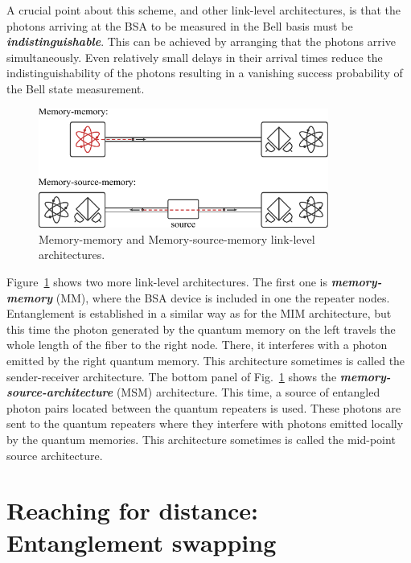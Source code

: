 A crucial point about this scheme, and other link-level architectures, is that the photons arriving at the BSA to be measured in the Bell basis must be \textit{\textbf{indistinguishable}}.
This can be achieved by arranging that the photons arrive simultaneously. 
Even relatively small delays in their arrival times reduce the indistinguishability of the photons resulting in a vanishing success probability of the Bell state measurement.

\begin{figure}[t]
    \centering
    \includegraphics[width=0.85\textwidth]{lesson12/12-2_MM_MSM.pdf}
    \caption[MM and MSM architectures]{Memory-memory and Memory-source-memory link-level architectures.}
    \label{fig:12-2_MM_MSM}
\end{figure}

Figure~\ref{fig:12-2_MM_MSM} shows two more link-level architectures.
The first one is \textit{\textbf{memory-memory}} (MM), where the BSA device is included in one the repeater nodes.
Entanglement is established in a similar way as for the MIM architecture, but this time the photon generated by the quantum memory on the left travels the whole length of the fiber to the right node.
There, it interferes with a photon emitted by the right quantum memory.
This architecture sometimes is called the sender-receiver architecture.
The bottom panel of Fig.~\ref{fig:12-2_MM_MSM} shows the \textit{\textbf{memory-source-architecture}} (MSM) architecture.
This time, a source of entangled photon pairs located between the quantum repeaters is used.
These photons are sent to the quantum repeaters where they interfere with photons emitted locally by the quantum memories. This architecture sometimes is called the mid-point source architecture.


\section{Reaching for distance: Entanglement swapping}
\label{sec:12-3_reaching_for_distance}

